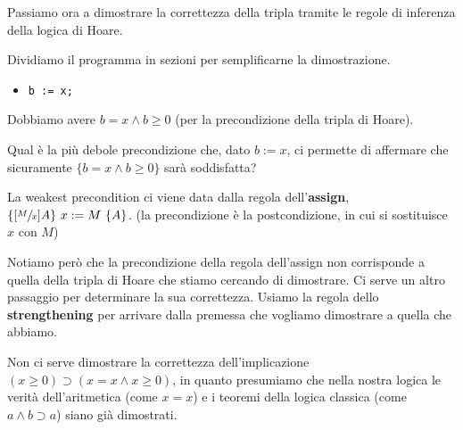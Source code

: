 \documentclass[a4paper,11pt]{report}
\begin{document}
Passiamo ora a dimostrare la correttezza della tripla tramite le regole di inferenza della logica di Hoare.

Dividiamo il programma in sezioni per semplificarne la dimostrazione.

\begin{itemize}
    \item \texttt{b := x;}
\end{itemize}

{\color{gray}

Dobbiamo avere \( b = x \land b\geq 0 \) (per la precondizione della tripla di Hoare).

\begin{prooftree}
\end{prooftree}

Qual è la più debole precondizione che, dato \( b := x \), ci permette di affermare che sicuramente \( \{ b=x \land b\geq 0 \}\) sarà soddisfatta?
}

La weakest precondition ci viene data dalla regola dell'\textbf{assign}, \( \{[\sfrac{M}{x}]A\} \ x:= M \ \{A\}\).
{\color{gray}\small (la precondizione è la postcondizione, in cui si sostituisce \( x \) con \( 
M \))}

\begin{prooftree}
\end{prooftree}

Notiamo però che la precondizione della regola dell'assign non corrisponde a quella della tripla di Hoare che stiamo cercando di dimostrare. Ci serve un altro passaggio per determinare la sua correttezza. Usiamo la regola dello \textbf{strengthening} per arrivare dalla premessa che vogliamo dimostrare a quella che abbiamo.

\begin{prooftree}
\end{prooftree}

Non ci serve dimostrare la correttezza dell'implicazione \( (x\geq 0) \supset (x = x \land x\geq 0) \), in quanto presumiamo che nella nostra logica le verità dell'aritmetica (come \( x = x \)) e i teoremi della logica classica (come \( a \land b \supset a \)) siano già dimostrati.
\end{document}
